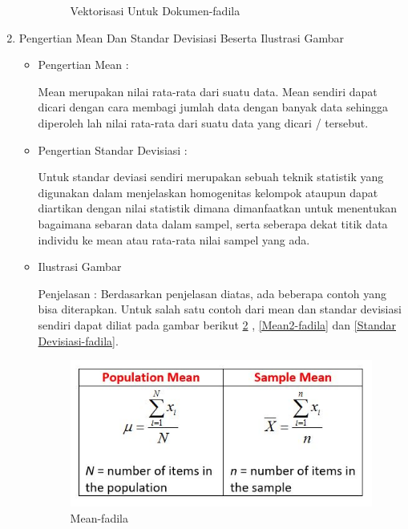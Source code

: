 \begin{enumerate}
\begin{itemize}
\begin{figure}[!hbtp]
\caption{Vektorisasi Untuk Dokumen-fadila}
\label{Vektorisasi Untuk Dokumen-fadila}
\end{figure}
\par
\end{itemize}
\par
\par
\item Pengertian Mean Dan Standar Devisiasi Beserta Ilustrasi Gambar
\begin{itemize}
\item  Pengertian Mean :
\par Mean merupakan nilai rata-rata dari suatu data. Mean sendiri dapat dicari dengan cara membagi jumlah data dengan banyak data sehingga diperoleh lah nilai rata-rata dari suatu data yang dicari / tersebut. 
\par
\par
\item  Pengertian Standar Devisiasi :
\par Untuk standar deviasi sendiri merupakan sebuah teknik statistik yang digunakan dalam menjelaskan homogenitas kelompok ataupun dapat diartikan dengan nilai statistik dimana dimanfaatkan untuk menentukan bagaimana sebaran data dalam sampel, serta seberapa dekat titik data individu ke mean atau rata-rata nilai sampel yang ada. 
\par
\par
\item Ilustrasi Gambar
\par Penjelasan : Berdasarkan penjelasan diatas, ada beberapa contoh yang bisa diterapkan. Untuk salah satu contoh dari mean dan standar devisiasi sendiri dapat diliat pada gambar berikut \ref{Mean-fadila} , \ref{Mean2-fadila}  dan \ref{Standar Devisiasi-fadila}.
\begin{figure}[!hbtp]
\centering
\includegraphics[scale=0.17]{figures/mean-fadila.jpg}
\caption{Mean-fadila}
\label{Mean-fadila}
\end{figure}

\end{itemize}
\end{enumerate}
